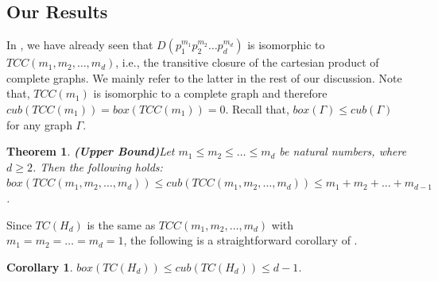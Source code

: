\documentclass[twoside, 11pt]{article}
\newtheorem{theorem}{Theorem}
\newtheorem{corollary}{Corollary}
\newcommand{\M}{TCC(m_1,m_2,\dots,m_d)}
\newcommand{\G}{\Gamma}
\begin{document}
\subsection{Our Results}
In , we have already seen that $D(p_1^{m_1}p_2^{m_2}\dots p_d^{m_d})$ is isomorphic to $\M$, i.e., the transitive closure of the cartesian product of complete graphs. We mainly refer to the latter in the rest of our discussion. Note that, $TCC(m_1)$ is isomorphic to a complete graph and therefore $cub(TCC(m_1))= box(TCC(m_1)) = 0$. Recall that, $box(\G) \leq cub (\G)$ for any graph $\G$.

\begin{theorem}\textbf{(Upper Bound)}\label{upper bound}
    Let $m_1 \leq m_2 \leq \dots \leq m_d$ be natural numbers, where $d \geq 2$. Then the following holds:\\
   $box(\M) \le cub(\M) \leq m_1 + m_2 + \dots + m_{d-1}$.
\end{theorem}

Since $TC(H_d)$ is the same as $\M$ with $m_1=m_2=\dots=m_d=1$, the following is a straightforward corollary of . 

\begin{corollary}\label{hypercube}
 $box (TC(H_d)) \le cub(TC(H_d))\leq d-1$.
\end{corollary}




\end{document}
